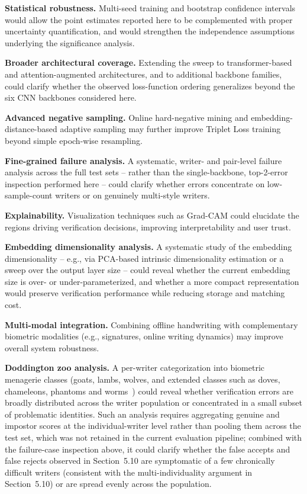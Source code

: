 \textbf{Statistical robustness.} Multi-seed training and bootstrap confidence intervals would allow the point estimates reported here to be complemented with proper uncertainty quantification, and would strengthen the independence assumptions underlying the significance analysis.

\textbf{Broader architectural coverage.} Extending the sweep to transformer-based and attention-augmented architectures, and to additional backbone families, could clarify whether the observed loss-function ordering generalizes beyond the six CNN backbones considered here.

\textbf{Advanced negative sampling.} Online hard-negative mining and embedding-distance-based adaptive sampling may further improve Triplet Loss training beyond simple epoch-wise resampling.

\textbf{Fine-grained failure analysis.} A systematic, writer- and pair-level failure analysis across the full test sets -- rather than the single-backbone, top-2-error inspection performed here -- could clarify whether errors concentrate on low-sample-count writers or on genuinely multi-style writers.

\textbf{Explainability.} Visualization techniques such as Grad-CAM could elucidate the regions driving verification decisions, improving interpretability and user trust.

\textbf{Embedding dimensionality analysis.} A systematic study of the embedding dimensionality -- e.g., via PCA-based intrinsic dimensionality estimation or a sweep over the output layer size -- could reveal whether the current embedding size is over- or under-parameterized, and whether a more compact representation would preserve verification performance while reducing storage and matching cost.

\textbf{Multi-modal integration.} Combining offline handwriting with complementary biometric modalities (e.g., signatures, online writing dynamics) may improve overall system robustness.

\textbf{Doddington zoo analysis.} A per-writer categorization into biometric menagerie classes 
(goats, lambs, wolves, and extended classes such as doves, chameleons, 
phantoms and worms~\cite{yager2010biometric}) could reveal 
whether verification errors are broadly distributed across the writer 
population or concentrated in a small subset of problematic identities. 
Such an analysis requires aggregating genuine and impostor scores at the 
individual-writer level rather than pooling them across the test set, which 
was not retained in the current evaluation pipeline; combined with the failure-case 
inspection above, it could clarify whether the false accepts and false rejects observed in Section~5.10 
are symptomatic of a few chronically difficult writers (consistent with the multi-individuality argument 
in Section~5.10) or are spread evenly across the population.

